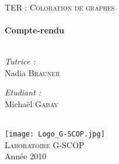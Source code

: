 \begin{titlepage}
\begin{center}

\quad \\[2cm]
 
\textsc{\Large TER : Coloration de graphes}\\[0.5cm]

\HRule \\[0.5cm]
{ \huge \bfseries Compte-rendu}\\[0.4cm]  %
 
\HRule \\[1.5cm]

\begin{minipage}{0.4\textwidth}
\begin{flushleft} \large
\emph{Tutrice :}\\
Nadia \textsc{Brauner}
\end{flushleft}
\end{minipage}
\begin{minipage}{0.4\textwidth}
\begin{flushright} \large
\emph{Etudiant :} \\

Michaël \textsc{Gabay}\\
\end{flushright}
\end{minipage}


\quad \\[1.5cm]

\texttt{[image: Logo\_G-SCOP.jpg]} \\[1.5cm]

\textsc{\LARGE Laboratoire G-SCOP}\\[1.5cm]

\vfill 
{\large Année 2010}

\end{center} 
\end{titlepage}
